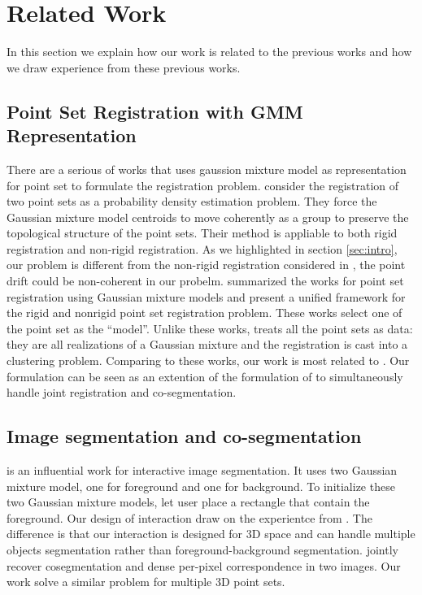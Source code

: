 \section{Related Work}
\label{sec:rw}
In this section we explain how our work is related to the previous works and how we draw experience from these previous works.
\subsection{Point Set Registration with GMM Representation}
\label{subsec:gmmreg}
There are a serious of works that uses gaussion mixture model as representation for point set to formulate the registration problem.
\cite{CPD} consider the registration of two point sets as a probability density estimation problem. They force the Gaussian mixture model centroids to move coherently as a group to preserve the topological structure of the point sets. Their method is appliable to both rigid registration and non-rigid registration. As we highlighted in section \ref{sec:intro}, our problem is different from the non-rigid registration considered in \cite{CPD}, the point drift could be non-coherent in our probelm.\cite{GMM_PAMI} summarized the works for point set registration using Gaussian mixture models and present a unified framework for the rigid and nonrigid point set registration problem. These works select one of the point set as the ``model''. Unlike these works, \cite{Evangelidis2014} treats all the point sets as data: they are all realizations of a Gaussian mixture and the registration is cast into a clustering problem. Comparing to these works, our work is most related to \cite{Evangelidis2014}. Our formulation can be seen as an extention of the formulation of \cite{Evangelidis2014} to simultaneously handle joint registration and co-segmentation.
\subsection{Image segmentation and co-segmentation}
\label{subsec:coseg}
\cite{grabcut} is an influential work for interactive image segmentation. It uses two Gaussian mixture model, one for foreground and one for background. To initialize these two Gaussian mixture models, \cite{grabcut} let user place a rectangle that contain the foreground. Our design of interaction draw on the experientce from \cite{grabcut}. The difference is that our interaction is designed for 3D space and can handle multiple objects segmentation rather than foreground-background segmentation. \cite{Taniai_2016_CVPR} jointly recover cosegmentation and dense per-pixel correspondence in two images. Our work solve a similar problem for multiple 3D point sets. 

